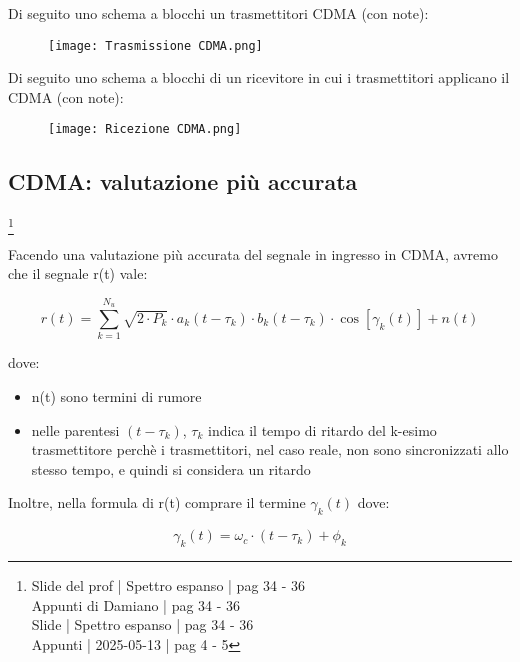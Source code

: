 Di seguito uno schema a blocchi un trasmettitori CDMA (con note): 

\begin{figure}[h]
    \centering
    \texttt{[image: Trasmissione CDMA.png]}
\end{figure}

Di seguito uno schema a blocchi di un ricevitore in cui i trasmettitori applicano il CDMA (con note): 

\begin{figure}[h]
    \centering
    \texttt{[image: Ricezione CDMA.png]}
\end{figure}

\newpage 

\subsection{CDMA: valutazione più accurata}
\footnote{Slide del prof | Spettro espanso | pag 34 - 36 \\
Appunti di Damiano | pag 34 - 36\\
Slide | Spettro espanso | pag 34 - 36 \\
Appunti | 2025-05-13 | pag 4 - 5
} 

Facendo una valutazione più accurata del segnale in ingresso in CDMA, 
avremo che il segnale r(t) vale: 

{
    \Large 
    \begin{equation}
        r(t)
        =
        \sum_{k = 1}^{N_u}
        \sqrt{2 \cdot P_k}
        \cdot 
        a_k (t - \tau_k)
        \cdot 
        b_k (t - \tau_k)
        \cdot 
        \cos
        \left[
            \gamma_{k} (t)
        \right]
        + 
        n(t)
    \end{equation}
}

dove: 

\begin{itemize}
    \item n(t) sono termini di rumore 
    \item nelle parentesi $(t - \tau_k)$, 
    $\tau_k$ indica il tempo di ritardo del k-esimo trasmettitore 
    perchè i trasmettitori, nel caso reale, non sono sincronizzati allo stesso tempo, 
    e quindi si considera un ritardo 
\end{itemize}

Inoltre, nella formula di r(t) comprare il termine $\gamma_k (t)$ dove: 

{
    \Large 
    \begin{equation}
        \gamma_k (t)
        = 
        \omega_c \cdot (t - \tau_k) + \phi_k
    \end{equation}
}

